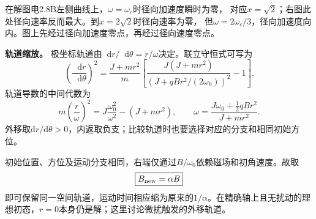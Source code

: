 \documentclass[UTF8,fontset=fandol,a4paper,11pt]{ctexart}
\newcommand{\dd}{\mathop{}\!\mathrm{d}}
\newcommand{\result}[1]{\begin{equation*}\boxed{#1}\end{equation*}}
\begin{document}
在解图电2.8B左侧曲线上，$\omega=\omega_c$时径向加速度瞬时为零，
对应$x=\sqrt2$；右图此处径向速率反而最大。到$x=2\sqrt2$时径向速率为零，
但$\omega=2\omega_c/3$，径向加速度向内。图上先经过径向加速度零点，再经过径向速度零点。

\textbf{轨道缩放。} 极坐标轨道由$\dd r/\dd\theta=\dot r/\omega$决定。联立守恒式可写为
\[
 \left(\frac{\dd r}{\dd\theta}\right)^2
 =\frac{J+mr^2}{m}\left[
 \frac{J(J+mr^2)}{(J+qBr^2/(2\omega_0))^2}-1\right].
\]
轨道导数的中间代数为
\[
m\left(\frac{\dot r}{\omega}\right)^2
=J\frac{\omega_0^2}{\omega^2}-(J+mr^2),\qquad
\omega=\frac{J\omega_0+\tfrac12qBr^2}{J+mr^2}.
\]
外移取$\mathrm dr/\mathrm d\theta>0$，内返取负支；比较轨道时也要选择对应的分支和相同初始方位。


初始位置、方位及运动分支相同，右端仅通过$B/\omega_0$依赖磁场和初角速度。故取
\result{B_{\rm new}=\alpha B}
即可保留同一空间轨道，运动时间相应缩为原来的$1/\alpha$。在精确轴上且无扰动的理想初态，$r=0$本身仍是解；这里讨论微扰触发的外移轨道。
\end{document}
